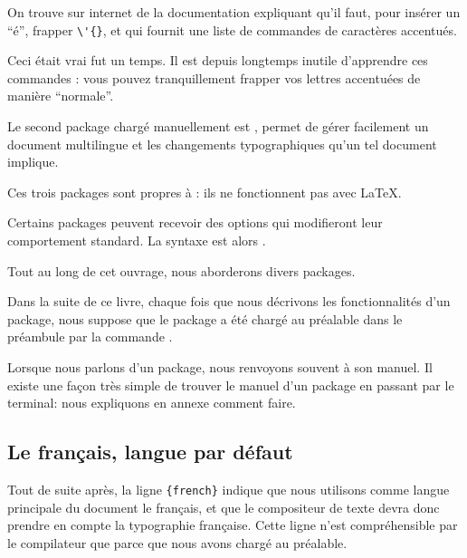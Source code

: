 \begin{plusloins}
On trouve sur internet de la documentation   expliquant qu'il faut,  pour insérer un \enquote{é},  frapper \verb|\'{}|, et qui fournit une liste de commandes de caractères accentués. 

Ceci était vrai fut un temps. Il est depuis longtemps inutile d'apprendre ces commandes : vous pouvez tranquillement frapper vos lettres accentuées de manière \enquote{normale}. 
\end{plusloins}

Le second package chargé manuellement est , permet de gérer facilement un document multilingue et les changements typographiques qu'un tel document implique.

Ces trois packages sont propres à \XeLaTeX  : ils ne fonctionnent pas avec \LaTeX.

Certains packages peuvent recevoir des options qui modifieront leur comportement standard. La syntaxe est alors .

Tout au long de cet ouvrage, nous aborderons divers packages.

\begin{attention}
Dans la suite de ce livre, chaque fois que nous décrivons les fonctionnalités d'un package, nous suppose que  le package a été chargé au préalable dans le préambule par la commande .
\end{attention}

\begin{plusloins}
Lorsque nous parlons d'un package, nous renvoyons souvent à son manuel. Il existe une façon très simple de trouver le manuel d'un package en passant par le terminal: nous expliquons en annexe comment faire.
\end{plusloins}

\subsection{Le français, langue par défaut\label{french}}

Tout de suite après, la ligne \verb|{french}| indique que nous utilisons comme langue principale du document le français, et  que le compositeur de texte devra   donc prendre en compte la typographie fran\c caise. Cette ligne n'est compréhensible par le compilateur que parce que nous avons chargé  au préalable.

